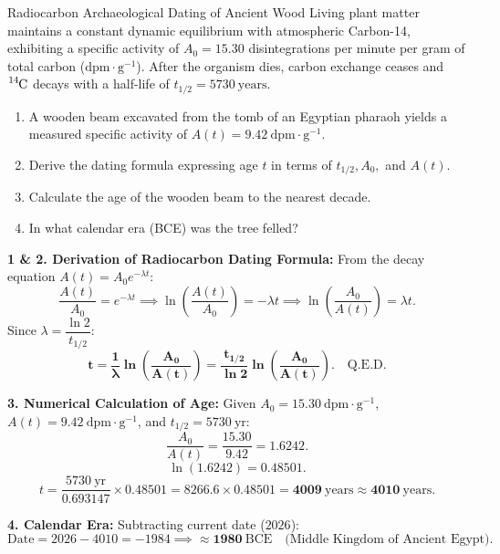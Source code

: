 \begin{exercise}{Radiocarbon Archaeological Dating of Ancient Wood}
Living plant matter maintains a constant dynamic equilibrium with atmospheric Carbon-14, exhibiting a specific activity of $A_0 = 15.30$ disintegrations per minute per gram of total carbon ($\mathrm{dpm\cdot g^{-1}}$). After the organism dies, carbon exchange ceases and $\ce{^{14}C}$ decays with a half-life of $t_{1/2} = 5730\ \mathrm{years}$.
\begin{enumerate}[leftmargin=1.5em,itemsep=2pt]
  \item A wooden beam excavated from the tomb of an Egyptian pharaoh yields a measured specific activity of $A(t) = 9.42\ \mathrm{dpm\cdot g^{-1}}$.
  \item Derive the dating formula expressing age $t$ in terms of $t_{1/2}, A_0,$ and $A(t)$.
  \item Calculate the age of the wooden beam to the nearest decade.
  \item In what calendar era (BCE) was the tree felled?
\end{enumerate}
\end{exercise}

\begin{tabletworkspace}[5.0cm]
\end{tabletworkspace}

\begin{solution}
\textbf{1 \& 2. Derivation of Radiocarbon Dating Formula:}
From the decay equation $A(t) = A_0 e^{-\lambda t}$:
\[
\frac{A(t)}{A_0} = e^{-\lambda t} \implies \ln \left( \frac{A(t)}{A_0} \right) = -\lambda t \implies \ln \left( \frac{A_0}{A(t)} \right) = \lambda t.
\]
Since $\lambda = \dfrac{\ln 2}{t_{1/2}}$:
\[
\mathbf{t = \frac{1}{\lambda} \ln \left( \frac{A_0}{A(t)} \right) = \frac{t_{1/2}}{\ln 2} \ln \left( \frac{A_0}{A(t)} \right)}. \quad \text{Q.E.D.}
\]

\textbf{3. Numerical Calculation of Age:}
Given $A_0 = 15.30\ \mathrm{dpm\cdot g^{-1}}$, $A(t) = 9.42\ \mathrm{dpm\cdot g^{-1}}$, and $t_{1/2} = 5730\ \mathrm{yr}$:
\[
\frac{A_0}{A(t)} = \frac{15.30}{9.42} = 1.6242.
\]
\[
\ln(1.6242) = 0.48501.
\]
\[
t = \frac{5730\ \mathrm{yr}}{0.693147} \times 0.48501 = 8266.6 \times 0.48501 = \mathbf{4009\ \mathrm{years}} \approx \mathbf{4010\ \mathrm{years}}.
\]

\textbf{4. Calendar Era:}
Subtracting current date ($2026$):
\[
\text{Date} = 2026 - 4010 = -1984 \implies \mathbf{\approx 1980\ \mathrm{BCE}} \quad \text{(Middle Kingdom of Ancient Egypt)}.
\]
\end{solution}

